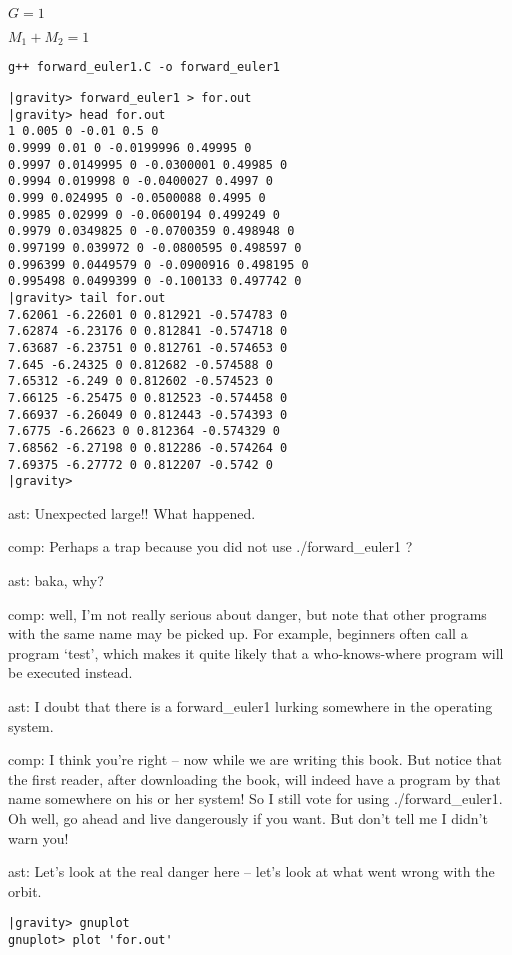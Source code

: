 $G=1$

$M_1 + M_2 = 1$



\begin{verbatim}
g++ forward_euler1.C -o forward_euler1
\end{verbatim}

\begin{verbatim}
|gravity> forward_euler1 > for.out
|gravity> head for.out
1 0.005 0 -0.01 0.5 0
0.9999 0.01 0 -0.0199996 0.49995 0
0.9997 0.0149995 0 -0.0300001 0.49985 0
0.9994 0.019998 0 -0.0400027 0.4997 0
0.999 0.024995 0 -0.0500088 0.4995 0
0.9985 0.02999 0 -0.0600194 0.499249 0
0.9979 0.0349825 0 -0.0700359 0.498948 0
0.997199 0.039972 0 -0.0800595 0.498597 0
0.996399 0.0449579 0 -0.0900916 0.498195 0
0.995498 0.0499399 0 -0.100133 0.497742 0
|gravity> tail for.out
7.62061 -6.22601 0 0.812921 -0.574783 0
7.62874 -6.23176 0 0.812841 -0.574718 0
7.63687 -6.23751 0 0.812761 -0.574653 0
7.645 -6.24325 0 0.812682 -0.574588 0
7.65312 -6.249 0 0.812602 -0.574523 0
7.66125 -6.25475 0 0.812523 -0.574458 0
7.66937 -6.26049 0 0.812443 -0.574393 0
7.6775 -6.26623 0 0.812364 -0.574329 0
7.68562 -6.27198 0 0.812286 -0.574264 0
7.69375 -6.27772 0 0.812207 -0.5742 0
|gravity>
\end{verbatim}

ast: Unexpected large!! What happened.

comp: Perhaps a trap because you did not use ./forward\_euler1 ?

ast: baka, why?

comp: well, I'm not really serious about danger, but note that other
programs with the same name may be picked up.  For example, beginners
often call a program `test', which makes it quite likely that a
who-knows-where program will be executed instead.

ast: I doubt that there is a forward\_euler1 lurking somewhere in the
operating system.

comp: I think you're right -- now while we are writing this book.  But
notice that the first reader, after downloading the book, will indeed
have a program by that name somewhere on his or her system!  So I
still vote for using ./forward\_euler1.  Oh well, go ahead and live
dangerously if you want.  But don't tell me I didn't warn you!

ast: Let's look at the real danger here -- let's look at what went
wrong with the orbit.

\begin{verbatim}
|gravity> gnuplot
gnuplot> plot 'for.out'
\end{verbatim}

